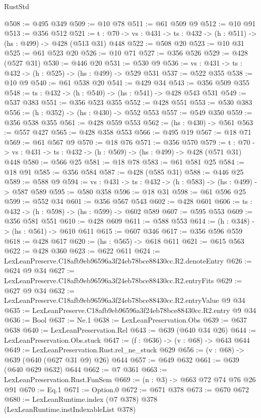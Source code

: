 \begin{lexlean}{RustStd}
\begin{coremodule}
@508 := @495 @349
@509 := @10 @78
@511 := @61 @509 @9
@512 := @10 @91
@513 := @356 @512
@521 := {t : @70} -> {vs : @431} -> {ts : @432} -> (h : @511) -> (hs : @499) -> @428 (@513 @31) @448
@522 := @508 @20
@523 := @10 @31
@525 := @61 @523 @20
@526 := @10 @71
@527 := @356 @526
@529 := @428 (@527 @31)
@530 := @446 @20
@531 := @530 @9
@536 := {vs : @431} -> {ts : @432} -> (h : @525) -> (hs : @499) -> @529 @531
@537 := @522 @355
@538 := @10 @9
@540 := @61 @538 @20
@541 := @429 @34
@543 := @356 @509 @355
@548 := {ts : @432} -> (h : @540) -> (hs : @541) -> @428 @543 @531
@549 := @537 @383
@551 := @356 @523 @355
@552 := @428 @551
@553 := @530 @383
@556 := (h : @352) -> (hs : @430) -> @552 @553
@557 := @549 @350
@559 := @356 @538 @355
@561 := @428 @559 @553
@562 := (hs : @430) -> @561
@563 := @557 @427
@565 := @428 @358 @553
@566 := @495 @19
@567 := @18 @71
@569 := @61 @567 @9
@570 := @18 @76
@571 := @356 @570
@579 := {t : @70} -> {vs : @431} -> {ts : @432} -> (h : @569) -> (hs : @499) -> @428 (@571 @31) @448
@580 := @566 @25
@581 := @18 @78
@583 := @61 @581 @25
@584 := @18 @91
@585 := @356 @584
@587 := @428 (@585 @31)
@588 := @446 @25
@589 := @588 @9
@594 := {vs : @431} -> {ts : @432} -> (h : @583) -> (hs : @499) -> @587 @589
@595 := @580 @358
@596 := @18 @31
@598 := @61 @596 @25
@599 := @552 @34
@601 := @356 @567 @543
@602 := @428 @601
@606 := {ts : @432} -> (h : @598) -> (hs : @599) -> @602 @589
@607 := @595 @553
@609 := @356 @581 @551
@610 := @428 @609
@611 := @588 @553
@614 := (h : @348) -> (hs : @561) -> @610 @611
@615 := @607 @346
@617 := @356 @596 @559
@618 := @428 @617
@620 := (hs : @565) -> @618 @611
@621 := @615 @563
@622 := @428 @360
@623 := @622 @611
@624 := LexLeanPreserve.C18afb9eb96596a3f24eb78bce88430cc.R2.denoteEntry
@626 := @624 @9 @34
@627 := LexLeanPreserve.C18afb9eb96596a3f24eb78bce88430cc.R2.entryFits
@629 := @627 @9 @34
@632 := LexLeanPreserve.C18afb9eb96596a3f24eb78bce88430cc.R2.entryValue @9 @34
@635 := LexLeanPreserve.C18afb9eb96596a3f24eb78bce88430cc.R2.entry @9 @34
@636 := Bool
@637 := Ne.{1}
@638 := LexLeanPreservation.Obs
@639 := @637 @638
@640 := LexLeanPreservation.Rel
@643 := @639 (@640 @34 @26)
@644 := LexLeanPreservation.Obs.stuck
@647 := (f : @636) -> (v : @68) -> @643 @644
@649 := LexLeanPreservation.Rust.rel_ne_stuck @629
@656 := (v : @68) -> @639 (@640 (@627 @31 @9) @26) @644
@657 := @649 @632
@661 := @639 (@640 @629 @632) @644
@662 := @7 @361
@663 := LexLeanPreservation.Rust.FunSem
@669 := (n : @3) -> @663 @72 @74 @76 @26 @91
@670 := Eq.{1}
@671 := Option.{0}
@672 := @671 @378
@673 := @670 @672
@680 := LexLeanRuntime.index (@7 @378) @378 (LexLeanRuntime.instIndexableList @378)

\end{coremodule}
\end{lexlean}
